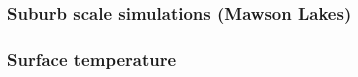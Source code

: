 \documentclass[final,3p,times,authoryear]{elsarticle}
\newcommand{\degreeC}{\ensuremath{^\circ}C }
\begin{document}

 












\subsubsection{Suburb scale simulations (Mawson Lakes)}\label{sec:suburbresult} 
\subsubsection*{Surface temperature}\label{sec:surftempresult} 
\end{document}
